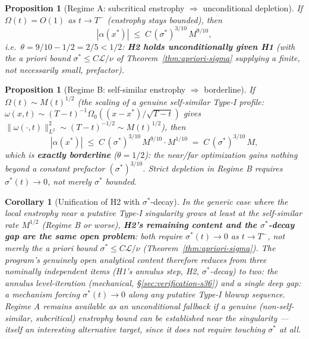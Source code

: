 \documentclass[11pt]{article}
\newtheorem{proposition}[theorem]{Proposition}
\newtheorem{corollary}[theorem]{Corollary}
\theoremstyle{definition}
\theoremstyle{remark}
\begin{document}
\begin{proposition}[Regime A: subcritical enstrophy $\Rightarrow$ unconditional depletion]
  \label{prop:regime-A}
  If $\Omega(t) = O(1)$ as $t\to T^-$ (enstrophy stays bounded), then
  \[
    |\alpha(x^*)| \;\leq\; C\,(\sigma^*)^{3/10}\,M^{9/10},
  \]
  i.e.\ $\theta = 9/10 - 1/2 = 2/5 < 1/2$: \textbf{H2 holds unconditionally
  given H1} (with the a priori bound $\sigma^*\leq C\mathcal{L}/\nu$ of
  Theorem~\ref{thm:apriori-sigma} supplying a finite, not necessarily
  small, prefactor).
\end{proposition}

\begin{proposition}[Regime B: self-similar enstrophy $\Rightarrow$ borderline]
  \label{prop:regime-B}
  If $\Omega(t)\sim M(t)^{1/2}$ (the scaling of a genuine self-similar
  Type-I profile: $\omega(x,t)\sim(T-t)^{-1}\Omega_0((x-x^*)/\sqrt{T-t})$
  gives $\|\omega(\cdot,t)\|_{L^2}^2\sim(T-t)^{-1/2}\sim M(t)^{1/2}$), then
  \[
    |\alpha(x^*)| \;\leq\; C\,(\sigma^*)^{3/10}\,M^{9/10}\cdot M^{1/10}
    \;=\; C\,(\sigma^*)^{3/10}\,M,
  \]
  which is \textbf{exactly borderline} ($\theta=1/2$): the near/far
  optimization gains nothing beyond a constant prefactor $(\sigma^*)^{3/10}$.
  Strict depletion in Regime B requires $\sigma^*(t)\to 0$, not merely
  $\sigma^*$ bounded.
\end{proposition}

\begin{corollary}[Unification of H2 with $\sigma^*$-decay]\label{cor:unification}
  In the generic case where the local enstrophy near a putative Type-I
  singularity grows at least at the self-similar rate $M^{1/2}$ (Regime B
  or worse), \textbf{H2's remaining content and the $\sigma^*$-decay gap
  are the same open problem}: both require $\sigma^*(t)\to 0$ as $t\to T^-$,
  not merely the a priori bound $\sigma^*\leq C\mathcal{L}/\nu$
  (Theorem~\ref{thm:apriori-sigma}). The program's genuinely open
  analytical content therefore reduces from three nominally independent
  items (H1's annulus step, H2, $\sigma^*$-decay) to \emph{two}: the
  annulus level-iteration (mechanical, \S\ref{sec:verification-s36}) and
  \emph{a single deep gap}: a mechanism forcing $\sigma^*(t)\to 0$ along
  any putative Type-I blowup sequence. Regime A remains available as an
  unconditional fallback if a genuine (non-self-similar, subcritical)
  enstrophy bound can be established near the singularity --- itself an
  interesting alternative target, since it does not require touching
  $\sigma^*$ at all.
\end{corollary}
\end{document}
